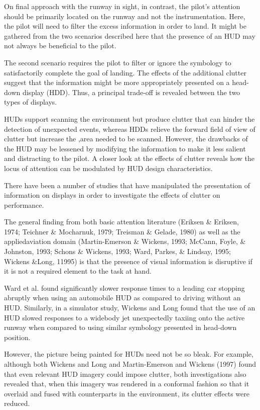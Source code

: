 \documentclass[utf8,bachelor,manualbib]{gradu3}
\begin{document}
On final approach with the runway in sight, in contrast, the pilot's attention should be primarily located on the runway and not the instrumentation. Here, the pilot will need to filter the excess information in order to land. It might be gathered from the two scenarios described here that the presence of an HUD may not always be beneficial to the pilot. 









The second scenario requires the pilot to filter or ignore the symbology to satisfactorily complete the goal of landing. The effects of the additional clutter suggest that the information might be more appropriately presented on a head-down display (HDD). Thus, a principal trade-off is revealed between the two types of displays.

HUDs support scanning the environment but produce clutter that can hinder the detection of unexpected events, whereas HDDs relieve the forward field of view of clutter but increase the ,area needed to be scanned. However, the drawbacks of the HUD may be lessened by modifying the information to make it less salient and distracting to the pilot. A closer look at the effects of clutter reveals how the locus of attention can be modulated by HUD design characteristics.

There have been a number of studies that have manipulated the presentation of information on displays in order to investigate the effects of clutter on performance. 

The general finding from both basic attention literature (Eriksen \& Eriksen, 1974; Teichner \& Mocharnuk, 1979; Treisman \& Gelade, 1980) as well as the appliedaviation domain (Martin-Emerson \& Wickens, 1993; McCann, Foyle, \& Johnston, 1993; Schons \& Wickens, 1993; Ward, Parkes, \& Lindsay, 1995; Wickens \&Long, 11995) is that the presence of visual information is disruptive if it is not a required element to the task at hand.

Ward et al. found significantly slower response times to a leading car stopping abruptly when using an automobile HUD as compared to driving without an HUD. Similarly, in a simulator study, Wickens and Long found that the use of an HUD slowed responses to a widebody jet unexpectedly taxiing onto the active runway when compared to using similar symbology presented in head-down position.

However, the picture being painted for HUDs need not be so bleak. For example, although both Wickens and Long and Martin-Emerson and Wickens (1997) found that even relevant HUD imagery could impose clutter, both investigations also revealed that, when this imagery was rendered in a conformal fashion so that it overlaid and fused with counterparts in the environment, its clutter effects were reduced.
\end{document}
